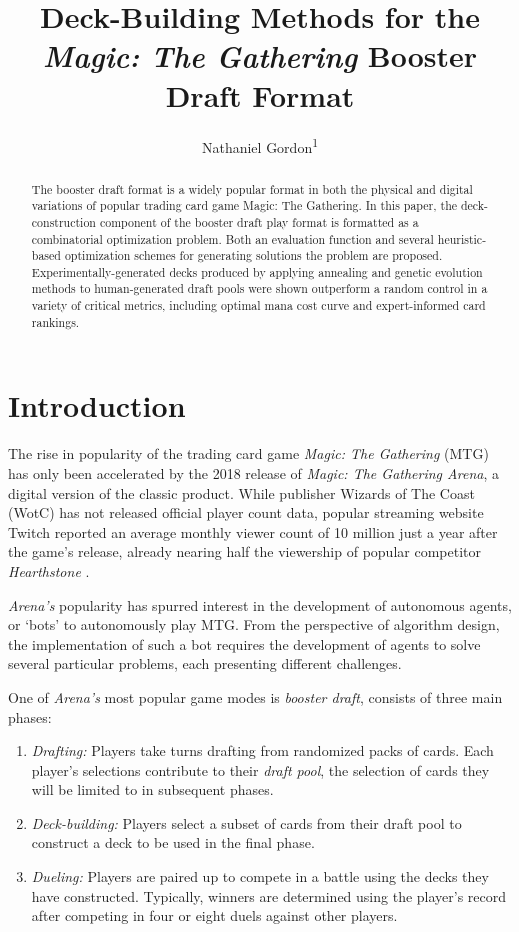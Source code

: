 \documentclass[letterpaper]{article} %
\title{Deck-Building Methods for the \textit{Magic: The Gathering} Booster Draft Format}
\author{
    Nathaniel Gordon\textsuperscript{\rm 1}
    \\
}
\begin{document}
\maketitle

\begin{abstract}

The booster draft format is a widely popular format in both the physical and digital variations of popular trading card game Magic: The Gathering. In this paper, the deck-construction component of the booster draft play format is formatted as a combinatorial optimization problem. Both an evaluation function and several heuristic-based optimization schemes for generating solutions the problem are proposed. Experimentally-generated decks produced by applying annealing and genetic evolution methods to human-generated draft pools were shown outperform a random control in a variety of critical metrics, including optimal mana cost curve and expert-informed card rankings. 

\end{abstract}

\section{Introduction}

The rise in popularity of the trading card game \textit{Magic: The Gathering} (MTG) has only been accelerated by the 2018 release of \textit{Magic: The Gathering Arena}, a digital version of the classic product. While publisher Wizards of The Coast (WotC) has not released official player count data, popular streaming website Twitch reported an average monthly viewer count of 10 million just a year after the game's release, already nearing half the viewership of popular competitor \textit{Hearthstone} \cite{espn20}.

\textit{Arena's} popularity has spurred interest in the development of autonomous agents, or `bots' to autonomously play MTG. From the perspective of algorithm design, the implementation of such a bot requires the development of agents to solve several particular problems, each presenting different challenges. 

One of \textit{Arena's} most popular game modes is \textit{booster draft}, consists of three main phases:

\begin{enumerate}
    \item \textit{Drafting:} Players take turns drafting from randomized packs of cards. Each player's selections contribute to their \textit{draft pool}, the selection of cards they will be limited to in subsequent phases.
    \item \textit{Deck-building:} Players select a subset of cards from their draft pool to construct a deck to be used in the final phase.
    \item \textit{Dueling:} Players are paired up to compete in a battle using the decks they have constructed. Typically, winners are determined using the player's record after competing in four or eight duels against other players.
\end{enumerate}
\end{document}
